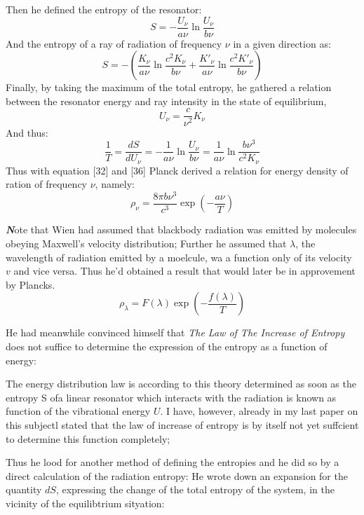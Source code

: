 \documentclass[9pt,a4paper, twocolumn]{article}
\newcounter{theo}
\newenvironment{callout}
	{\begin{calloutbox}\color{charcoal}\textbf\textit}
	{\end{calloutbox}}
\begin{document}
            Then he defined the entropy of the resonator:
            \begin{equation}
                S = -\frac{U_\nu}{a\nu} \ln \frac{U_\nu}{b\nu}
            \end{equation}
            And the entropy of a ray of radiation of frequency $\nu$ in a given direction as:
            \begin{equation}
                S = -\left(\frac{K_\nu}{a\nu}\ln\frac{c^2K_\nu}{b\nu}+\frac{K'_\nu}{a\nu}\ln\frac{c^2K'_\nu}{b\nu}\right)
            \end{equation}
            Finally, by taking the maximum of the total entropy, he gathered a relation between the resonator energy and ray intensity in the state of equilibrium, 
            \begin{equation}
                U_\nu = \frac{c}{\nu^2}K_\nu
            \end{equation}
            And thus:
            \begin{equation}
                \frac1T = \frac{dS}{dU_\nu} = -\frac{1}{a\nu}\ln\frac{U_\nu}{b\nu} = \frac1{a\nu}\ln\frac{b\nu^3}{c^2K_\nu}
            \end{equation}
            Thus with equation [32] and [36] Planck derived a relation for energy density of ration of frequency $\nu$, namely:
            \begin{equation}
                \rho_\nu = \frac{8\pi b\nu^3}{c^3}\exp(-\frac{a\nu}{T})
            \end{equation}
            \begin{callout}
                Note that Wien had assumed that blackbody radiation was emitted by molecules obeying Maxwell's velocity distribution; Further he assumed that $\lambda$, the wavelength of radiation emitted by a moelcule, wa a function only of its velocity $v$ and vice versa. Thus he'd obtained a result that would later be in approvement by Plancks.
                \begin{equation}
                    \rho_\lambda = F(\lambda)\exp(-\frac{f(\lambda)}{T})
                \end{equation}
            \end{callout}
            He had meanwhile convinced himself that \textit{The Law of The Increase of Entropy} does not suffice to determine the expression of the entropy as a function of energy:
            \begin{qt}
                The energy distribution law is according to this theory determined as soon as the entropy S ofa linear resonator which interacts with the radiation is known as function of the vibrational energy $U$. I have, however, already in my last paper on this subjectl stated that the law of increase of entropy is by itself not yet suffcient to determine this function completely;
            \end{qt}
            Thus he lood for another method of defining the entropies and he did so by a direct calculation of the radiation entropy: He wrote down an expansion for the quantity $dS$, expressing the change of the total entropy of the system, in the vicinity of the equilibtrium sityation:
\end{document}
